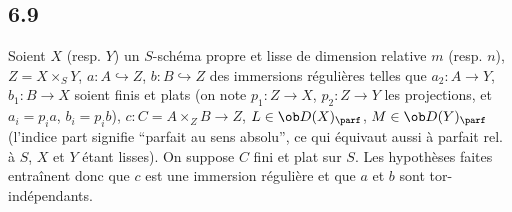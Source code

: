 \subsection*{6.9}

Soient $X$ (resp. $Y$) un $S$-schéma propre et lisse de dimension relative $m$ (resp. $n$), $Z=X\times_S Y$, $a:A\hookrightarrow Z$, $b:B\hookrightarrow Z$ des immersions régulières telles que $a_2:A\to Y$, $b_1:B\to X$ soient finis et plats (on note $p_1:Z\to X$, $p_2:Z\to Y$ les projections, et $a_i=p_i a$, $b_i=p_i b$), $c:C=A\times_Z B\to Z$, $L\in\ob D(X)_{\parf}$, $M\in\ob D(Y)_{\parf}$ (l'indice part signifie ``parfait au sens absolu'', ce qui équivaut aussi à parfait rel. à $S$, $X$ et $Y$ étant lisses). On suppose $C$ fini et plat sur $S$. Les hypothèses faites entraînent donc que $c$ est une immersion régulière et que $a$ et $b$ sont tor-indépendants.

